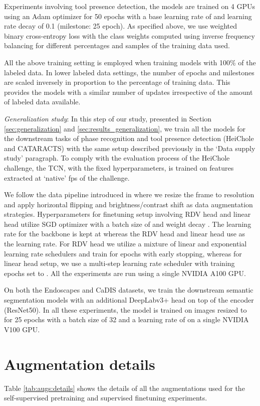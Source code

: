 \documentclass[times,twocolumn,final]{elsarticle}
\begin{document}
Experiments involving tool presence detection, the models are trained on 4 GPUs using an Adam optimizer for 50 epochs with a base learning rate of  and learning rate decay of 0.1 (milestone: 25 epoch). As specified above, we use weighted binary cross-entropy loss with the class weights computed using inverse frequency balancing for different percentages and samples of the training data used.

All the above training setting is employed when training models with 100\% of the labeled data. In lower labeled data settings, the number of epochs and milestones are scaled inversely in proportion to the percentage of training data. This provides the models with a similar number of updates irrespective of the amount of labeled data available.
\\

{\color{newtext} \textit{Generalization study}: In this step of our study, presented in Section \ref{sec:generalization} and \ref{sec:results_generalization}, we train all the models for the downstream tasks of phase recognition and tool presence detection (HeiChole and CATARACTS) with the same setup described previously in the `Data supply study' paragraph. To comply with the evaluation process of the HeiChole challenge, the TCN, with the fixed hyperparameters, is trained on features extracted at `native' fps of the challenge. 

We follow the data pipeline introduced in \cite{rdv} where we resize the frame to  resolution and apply horizontal flipping and brightness/contrast shift as data augmentation strategies. Hyperparameters for finetuning setup involving RDV head and linear head utilize SGD optimizer with a batch size of  and weight decay . The learning rate for the backbone is kept at  whereas the RDV head and linear head use  as the learning rate. For RDV head we utilize a mixture of linear and exponential learning rate schedulers and train for  epochs with early stopping, whereas for linear head setup, we use a multi-step learning rate scheduler with training epochs set to . All the experiments are run using a single NVIDIA A100 GPU.

On both the Endoscapes and CaDIS datasets, we train the downstream semantic segmentation models with an additional DeepLabv3+ head on top of the encoder (ResNet50). In all these experiments, the model is trained on images resized to  for 25 epochs with a batch size of 32 and a learning rate of  on a single NVIDIA V100 GPU. }

\section{Augmentation details}
Table \ref{tab:augs:details} shows the details of all the augmentations used for the self-supervised pretraining and supervised finetuning experiments. 
\end{document}
